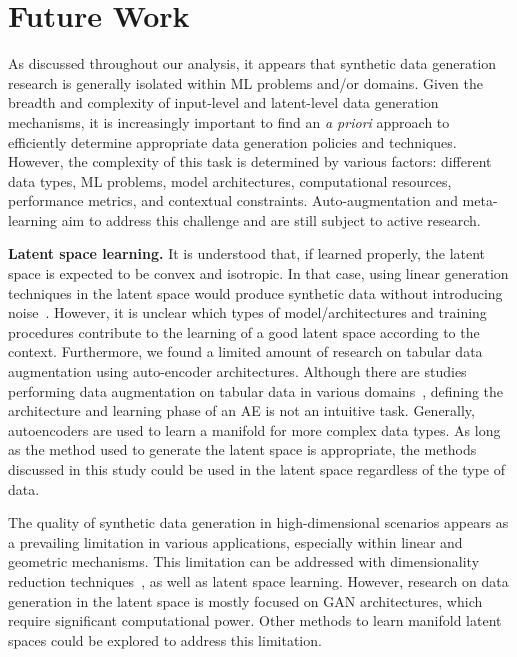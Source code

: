 \section{Future Work}\label{sec:future-work}

As discussed throughout our analysis, it appears that synthetic data
generation research is generally isolated within ML problems and/or domains.
Given the breadth and complexity of input-level and latent-level data
generation mechanisms, it is increasingly important to find an \textit{a
priori} approach to efficiently determine appropriate data generation policies
and techniques. However, the complexity of this task is determined by various
factors: different data types, ML problems, model architectures, computational
resources, performance metrics, and contextual constraints.
Auto-augmentation and meta-learning aim to address this challenge and are
still subject to active research.

\textbf{Latent space learning.} It is understood that, if learned
properly, the latent space is expected to be convex and isotropic. In that
case, using linear generation techniques in the latent space would produce
synthetic data without introducing noise~\cite{cheung2020modals}. However, it
is unclear which types of model/architectures and training procedures
contribute to the learning of a good latent space according to the context.
Furthermore, we found a limited amount of research on tabular data
augmentation using auto-encoder architectures. Although there are studies
performing data augmentation on tabular data in various
domains~\cite{delgado2021deep}, defining the architecture and learning phase
of an AE is not an intuitive task. Generally, autoencoders are used to learn a
manifold for more complex data types. As long as the method used to generate
the latent space is appropriate, the methods discussed in this study could be
used in the latent space regardless of the type of data.

The quality of synthetic data generation in high-dimensional scenarios appears
as a prevailing limitation in various applications, especially within linear
and geometric mechanisms. This limitation can be addressed with dimensionality
reduction techniques~\cite{roccetti2021alternative}, as well as latent space
learning.  However, research on data generation in the latent space is mostly
focused on GAN architectures, which require significant computational power.
Other methods to learn manifold latent spaces could be explored to address
this limitation.

